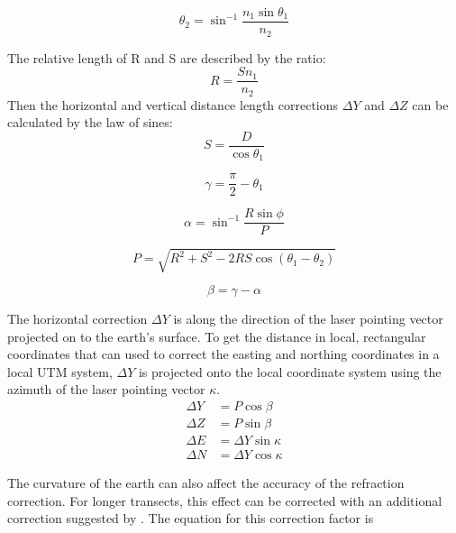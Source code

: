 \begin{equation}\label{eq:snellslaw}
      \theta_2 = \sin^{-1}{\frac{n_1 \sin{\theta_1}}{n_2}}
\end{equation}

The relative length of R and S are described by the ratio:
\begin{equation}
      R = \frac{S n_1}{n_2}
\end{equation}
Then the horizontal and vertical distance length corrections $\Delta Y$ and $\Delta Z$ can be calculated by the law of sines:
\begin{equation}
      S = \frac{D}{\cos{\theta_1}}
\end{equation}

\begin{equation}
      \gamma = \frac{\pi}{2} - \theta_1
\end{equation}

\begin{equation}
      \alpha = \sin^{-1}{\frac{R \sin{\phi}}{P}}
\end{equation}

\begin{equation}
      P = \sqrt{R^2 + S^2 - 2RS \cos{(\theta_1 - \theta_2)}}
\end{equation}

\begin{equation}
      \beta = \gamma - \alpha
\end{equation}

The horizontal correction $\Delta Y$ is along the direction of the laser pointing vector projected on to the earth's surface. To get the distance in local, rectangular coordinates that can used to correct the easting and northing coordinates in a local UTM system, $\Delta Y$ is projected onto the local coordinate system using the azimuth of the laser pointing vector $\kappa$.
\begin{align}
      \Delta Y & = P \cos{\beta}         \\
      \Delta Z & = P \sin{\beta}         \\
      \Delta E & = \Delta Y \sin{\kappa} \\
      \Delta N & = \Delta Y \cos{\kappa}
\end{align}


The curvature of the earth can also affect the accuracy of the refraction correction. For longer transects, this effect can be corrected with an additional correction suggested by \citeauthor{Parrish2019}. The equation for this correction factor is

